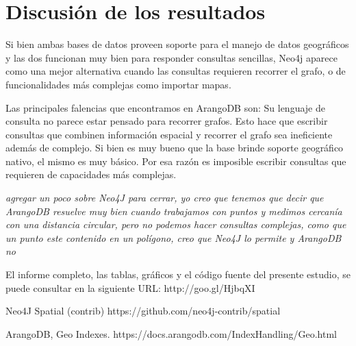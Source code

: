 \documentclass{llncs}
\begin{document}
\section{Discusión de los resultados}

Si bien ambas bases de datos proveen soporte para el manejo de datos geográficos y las dos funcionan muy bien para responder consultas sencillas, Neo4j aparece como una mejor alternativa cuando las consultas requieren recorrer el grafo, o de funcionalidades más complejas como importar mapas.

Las principales falencias que encontramos en ArangoDB son:
Su lenguaje de consulta no parece estar pensado para recorrer grafos. Esto hace que escribir consultas que combinen información espacial y recorrer el grafo sea ineficiente además de complejo.
Si bien es muy bueno que la base brinde soporte geográfico nativo, el mismo es muy básico. Por esa razón es imposible escribir consultas que requieren de capacidades más complejas.

\textit{agregar un poco sobre Neo4J para cerrar, yo creo que tenemos que decir que ArangoDB resuelve muy bien cuando trabajamos con puntos y medimos cercanía con una distancia circular, pero no podemos hacer consultas complejas, como que un punto este contenido en un polígono, creo que Neo4J lo permite y ArangoDB no}

El informe completo, las tablas, gráficos y el código fuente del presente estudio, se puede consultar en la siguiente URL: http://goo.gl/HjbqXI

%
%
\begin{thebibliography}{5}
%
Neo4J Spatial (contrib)
https://github.com/neo4j-contrib/spatial

ArangoDB, Geo Indexes.
https://docs.arangodb.com/IndexHandling/Geo.html

\end{thebibliography}
\end{document}

